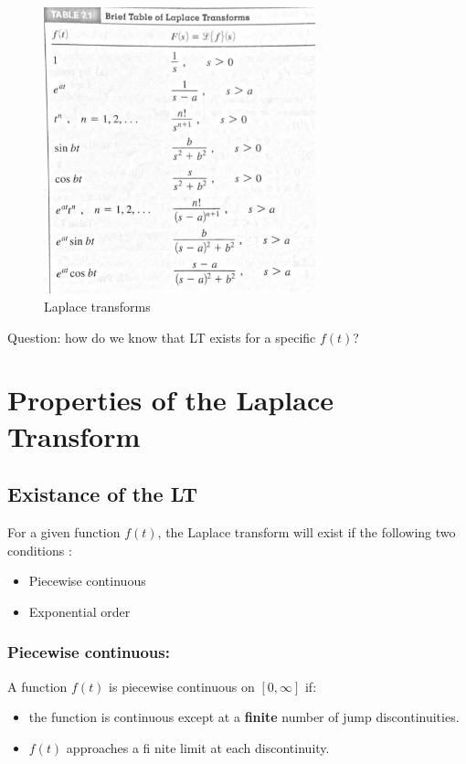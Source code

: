 \begin{figure}
\centering
\includegraphics[width=0.7\textwidth]{figs/LaplaceIdentities.png}  
\caption{Laplace transforms}
\end{figure}


Question: how do we know that LT exists for a specific $f(t)$?
\section{Properties of the Laplace Transform}
\subsection{Existance of the LT}
For a given function $f(t)$, the Laplace transform will exist if the following two conditions :
\begin{itemize}
\item Piecewise continuous
\item Exponential order 
\end{itemize}
\subsubsection{Piecewise continuous:} A function $f(t)$ is piecewise continuous on $\left[0,\infty\right]$ if:
\begin{itemize}
\item the function is continuous except at a \textbf{finite} number of jump discontinuities.
\item $f(t)$ approaches a fi nite limit at each discontinuity.
\end{itemize}


